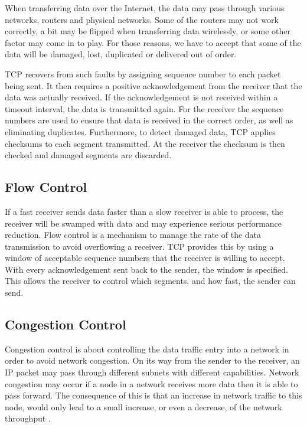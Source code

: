 When transferring data over the Internet, the data may pass through various
networks, routers and physical networks. Some of the routers may not work
correctly, a bit may be flipped when transferring data wirelessly, or some other
factor may come in to play. For those reasons, we have to accept that some of
the data will be damaged, lost, duplicated or delivered out of order.

TCP recovers from such faults by assigning sequence number to each packet being
sent. It then requires a positive acknowledgement from the receiver that the
data was actually received. If the acknowledgement is not received within a
timeout interval, the data is transmitted again. For the receiver the sequence
numbers are used to ensure that data is received in the correct order, as well
as eliminating duplicates. Furthermore, to detect damaged data, TCP applies
checksums to each segment transmitted. At the receiver the checksum is then
checked and damaged segments are discarded.

\subsection{Flow Control}

If a fast receiver sends data faster than a slow receiver is able to process,
the receiver will be swamped with data and may experience serious performance
reduction. Flow control is a mechanism to manage the rate of the data
transmission to avoid overflowing a receiver. TCP provides this by using a
window of acceptable sequence numbers that the receiver is willing to accept.
With every acknowledgement sent back to the sender, the window is specified.
This allows the receiver to control which segments, and how fast, the sender
can send.

\subsection{Congestion Control}

Congestion control is about controlling the data traffic entry into a network in
order to avoid network congestion. On its way from the sender to the receiver,
an IP packet may pass through different subnets with different capabilities.
Network congestion may occur if a node in a network receives more data then it
is able to pass forward. The consequence of this is that an increase in network
traffic to this node, would only lead to a small increase, or even a decrease,
of the network throughput \cite{Al-Bahadili2012}.

